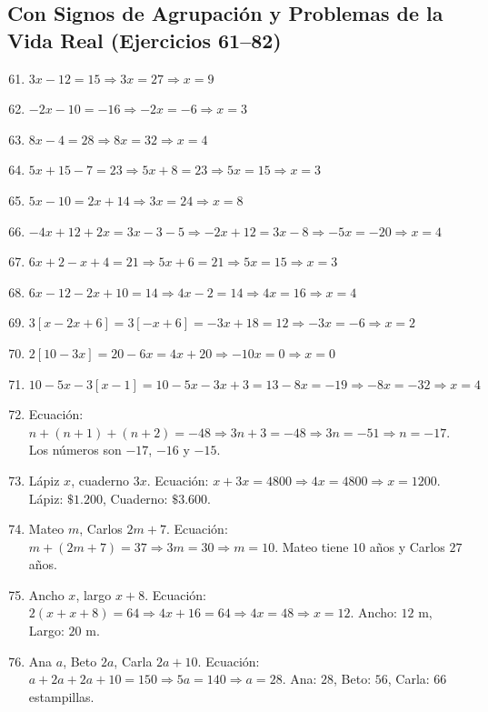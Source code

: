 \documentclass[12pt, letterpaper]{article}
\begin{document}
  \subsection*{Con Signos de Agrupación y Problemas de la Vida Real (Ejercicios 61--82)}

  \begin{enumerate}[leftmargin=*, label=\textbf{\arabic*.}]
    \setcounter{enumi}{60}
    \item $3x - 12 = 15 \Rightarrow 3x = 27 \Rightarrow x = 9$
    \item $-2x - 10 = -16 \Rightarrow -2x = -6 \Rightarrow x = 3$
    \item $8x - 4 = 28 \Rightarrow 8x = 32 \Rightarrow x = 4$
    \item $5x + 15 - 7 = 23 \Rightarrow 5x + 8 = 23 \Rightarrow 5x = 15 \Rightarrow x = 3$
    \item $5x - 10 = 2x + 14 \Rightarrow 3x = 24 \Rightarrow x = 8$
    \item $-4x + 12 + 2x = 3x - 3 - 5 \Rightarrow -2x + 12 = 3x - 8 \Rightarrow -5x = -20 \Rightarrow x = 4$
    \item $6x + 2 - x + 4 = 21 \Rightarrow 5x + 6 = 21 \Rightarrow 5x = 15 \Rightarrow x = 3$
    \item $6x - 12 - 2x + 10 = 14 \Rightarrow 4x - 2 = 14 \Rightarrow 4x = 16 \Rightarrow x = 4$
    \item $3[x - 2x + 6] = 3[-x + 6] = -3x + 18 = 12 \Rightarrow -3x = -6 \Rightarrow x = 2$
    \item $2[10 - 3x] = 20 - 6x = 4x + 20 \Rightarrow -10x = 0 \Rightarrow x = 0$
    \item $10 - 5x - 3[x - 1] = 10 - 5x - 3x + 3 = 13 - 8x = -19 \Rightarrow -8x = -32 \Rightarrow x = 4$
    \item Ecuación: $n + (n+1) + (n+2) = -48 \Rightarrow 3n + 3 = -48 \Rightarrow 3n = -51 \Rightarrow n = -17$. Los números son $-17$, $-16$ y $-15$.
    \item Lápiz $x$, cuaderno $3x$. Ecuación: $x + 3x = 4800 \Rightarrow 4x = 4800 \Rightarrow x = 1200$. Lápiz: $\$1.200$, Cuaderno: $\$3.600$.
    \item Mateo $m$, Carlos $2m + 7$. Ecuación: $m + (2m + 7) = 37 \Rightarrow 3m = 30 \Rightarrow m = 10$. Mateo tiene $10$ años y Carlos $27$ años.
    \item Ancho $x$, largo $x + 8$. Ecuación: $2(x + x + 8) = 64 \Rightarrow 4x + 16 = 64 \Rightarrow 4x = 48 \Rightarrow x = 12$. Ancho: $12$ m, Largo: $20$ m.
    \item Ana $a$, Beto $2a$, Carla $2a + 10$. Ecuación: $a + 2a + 2a + 10 = 150 \Rightarrow 5a = 140 \Rightarrow a = 28$. Ana: $28$, Beto: $56$, Carla: $66$ estampillas.

\end{enumerate}
\end{document}
